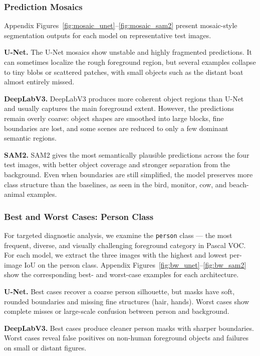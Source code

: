 \documentclass[11pt]{article}
\begin{document}
\subsubsection{Prediction Mosaics}

Appendix Figures~\ref{fig:mosaic_unet}--\ref{fig:mosaic_sam2} present mosaic-style segmentation outputs for each model on representative test images.

\textbf{U-Net.} The U-Net mosaics show unstable and highly fragmented predictions. It can sometimes localize the rough foreground region, but several examples collapse to tiny blobs or scattered patches, with small objects such as the distant boat almost entirely missed.

\textbf{DeepLabV3.} DeepLabV3 produces more coherent object regions than U-Net and usually captures the main foreground extent. However, the predictions remain overly coarse: object shapes are smoothed into large blocks, fine boundaries are lost, and some scenes are reduced to only a few dominant semantic regions.

\textbf{SAM2.} SAM2 gives the most semantically plausible predictions across the four test images, with better object coverage and stronger separation from the background. Even when boundaries are still simplified, the model preserves more class structure than the baselines, as seen in the bird, monitor, cow, and beach-animal examples.

\subsubsection{Best and Worst Cases: Person Class}

For targeted diagnostic analysis, we examine the \texttt{person} class --- the most frequent, diverse, and visually challenging foreground category in Pascal VOC. For each model, we extract the three images with the highest and lowest per-image IoU on the person class.
Appendix Figures~\ref{fig:bw_unet}--\ref{fig:bw_sam2} show the corresponding best- and worst-case examples for each architecture.

\textbf{U-Net.} Best cases recover a coarse person silhouette, but masks have soft, rounded boundaries and missing fine structures (hair, hands). Worst cases show complete misses or large-scale confusion between person and background.

\textbf{DeepLabV3.} Best cases produce cleaner person masks with sharper boundaries. Worst cases reveal false positives on non-human foreground objects and failures on small or distant figures.
\end{document}

